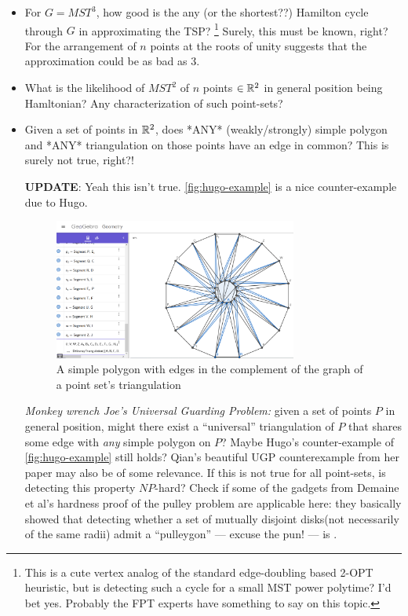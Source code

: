 \begin{appendices}
\begin{description}
\begin{itemize}
      \item For $G=MST^3$, how good is the any (or the shortest??) Hamilton cycle through $G$
            in approximating the TSP? \footnote{This is a cute vertex analog of the standard edge-doubling based 2-OPT heuristic, but is detecting such a cycle for a small MST power polytime? I'd bet yes. Probably the FPT experts have something to say on this topic.}  
            Surely, this must be known, right?  For the arrangement of $n$ points at the roots of unity suggests that the 
            approximation could be as bad as 3. 

       \item What is the likelihood of $MST^2$ of $n$ points $\in \mathbb{R}^2$ in general position being Hamltonian? 
             Any characterization of such point-sets? 

       \item Given a set of points in $\mathbb{R}^2$, does *ANY* 
             (weakly/strongly) simple polygon and *ANY* triangulation on those 
             points have an edge in common? This is surely not true, right?!
       
             \large{\textbf{UPDATE}}: Yeah this isn't true.  \autoref{fig:hugo-example} is a nice counter-example due to Hugo. 
             \begin{figure}[H]
             \centering
             \includegraphics[width=8cm]{miscimages/hugo-example.png}
             \caption{\label{fig:hugo-example} A simple polygon with edges in the complement of the graph of a point set's triangulation}
             \end{figure}

             \textit{Monkey wrench \ala Joe's Universal Guarding Problem:}
             given a set of points $P$ in general position, might there exist a ``universal'' triangulation of $P$ that shares some edge with  
             \textit{any} simple polygon on $P$? Maybe Hugo's counter-example of \autoref{fig:hugo-example} still holds? Qian's beautiful UGP 
                           counterexample from her paper may also be of some relevance. 
                           If this is not true for all point-sets, is detecting this property $NP$-hard? Check if some of the gadgets from 
                           Demaine et al's hardness proof of the pulley problem are applicable here: they basically showed that detecting
                           whether a set of mutually disjoint disks(not necessarily of the same radii) admit a ``pulleygon'' --- excuse the pun! --- is \nph. 
      \end{itemize}
 


\end{description}
\end{appendices}
